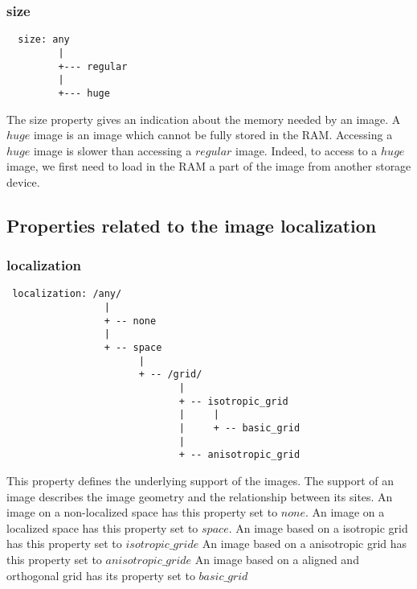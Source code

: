 
\subsubsection{size}

\begin{verbatim}
  size: any
         |
         +--- regular
         |
         +--- huge
\end{verbatim}


The size property gives an indication about the memory needed by an image.
A $huge$ image is an image which cannot be fully stored in the RAM.
Accessing a $huge$ image is slower than accessing a $regular$ image.
Indeed, to access to a $huge$ image, we first need to load in the RAM a part of
the image from another storage device.

\subsection{Properties related to the image localization}

\subsubsection{localization}

\begin{verbatim}
 localization: /any/
                 |
                 + -- none
                 |
                 + -- space
                       |
                       + -- /grid/
                              |
                              + -- isotropic_grid
                              |     |
                              |     + -- basic_grid
                              |
                              + -- anisotropic_grid

\end{verbatim}

This property defines the underlying support of the images.
The support of an image describes the image geometry and the relationship
between its sites.
An image on a non-localized space has this property set to $none$.
An image on a localized space has this property set to $space$.
An image based on a isotropic grid has this property set to $isotropic\_gride$
An image based on a anisotropic grid has this property set to
$anisotropic\_gride$
An image based on a aligned and orthogonal grid has its property set to
$basic\_grid$

